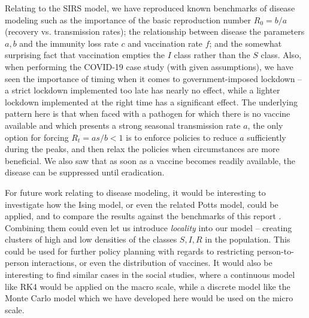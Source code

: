 \documentclass[]{article}
\begin{document}
Relating to the SIRS model, we have reproduced known benchmarks of disease modeling such as the importance of the basic reproduction number $R_0 = b/a$ (recovery vs. transmission rates); the relationship between disease the parameters $a,b$ and the immunity loss rate $c$ and vaccination rate $f$; and the somewhat surprising fact that vaccination empties the $I$ class rather than the $S$ class. Also, when performing the COVID-19 case study (with given assumptions), we have seen the importance of timing when it comes to government-imposed lockdown -- a strict lockdown implemented too late has nearly no effect, while a lighter lockdown implemented at the right time has a significant effect. The underlying pattern here is that when faced with a pathogen for which there is no vaccine available and which presents a strong seasonal transmission rate $a$, the only option for forcing $R_t = as/b < 1$ is to enforce policies to reduce $a$ sufficiently during the peaks, and then relax the policies when circumstances are more beneficial. We also saw that as soon as a vaccine becomes readily available, the disease can be suppressed until eradication.

For future work relating to disease modeling, it would be interesting to investigate how the Ising model, or even the related Potts model, could be applied, and to compare the results against the benchmarks of this report \cite{fys4150-notes}. Combining them could even let us introduce \textit{locality} into our model -- creating clusters of high and low densities of the classes $S,I,R$ in the population. This could be used for further policy planning with regards to restricting person-to-person interactions, or even the distribution of vaccines. It would also be interesting to find similar cases in the social studies, where a continuous model like RK4 would be applied on the macro scale, while a discrete model like the Monte Carlo model which we have developed here would be used on the micro scale.




\end{document}
